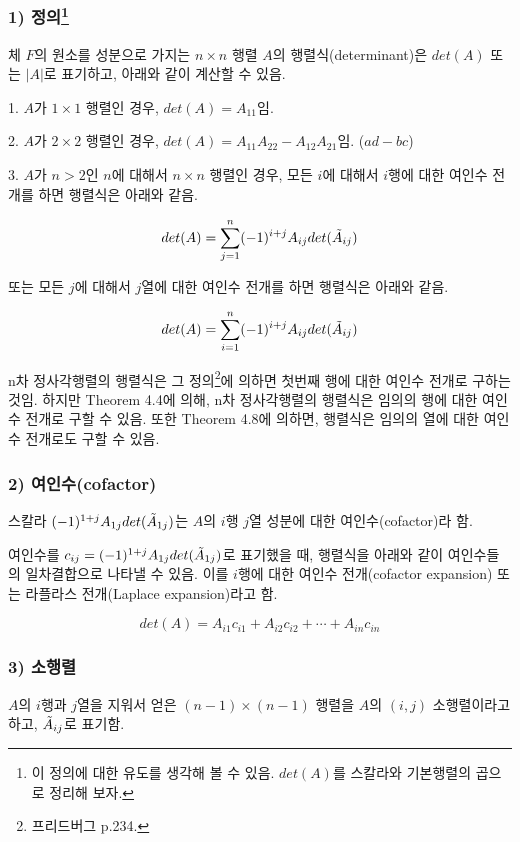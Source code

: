 \subsubsection*{1) 정의\footnote{이 정의에 대한 유도를 생각해 볼 수 있음. $det(A)$를 스칼라와 기본행렬의 곱으로 정리해 보자.}\\}
\begin{DEF}
체 $F$의 원소를 성분으로 가지는 $n \times n$ 행렬 $A$의 행렬식(determinant)은 $det(A)$ 또는 $|A|$로 표기하고, 아래와 같이 계산할 수 있음.

1. $A$가 $1 \times 1$ 행렬인 경우, $det(A)=A_{11}$임.

2. $A$가 $2 \times 2$ 행렬인 경우, $det(A)=A_{11}A_{22}-A_{12}A_{21}$임. ($ad-bc$)

3. $A$가 $n > 2$인 $n$에 대해서 $n \times n$ 행렬인 경우, 모든 $i$에 대해서 $i$행에 대한 여인수 전개를 하면 행렬식은 아래와 같음.

\[
det(A)=\sum^{n}_{j=1}(-1)^{i+j}A_{ij}det(\Tilde{A}_{ij})
\]

또는 모든 $j$에 대해서 $j$열에 대한 여인수 전개를 하면 행렬식은 아래와 같음.

\[
det(A)=\sum^{n}_{i=1}(-1)^{i+j}A_{ij}det(\Tilde{A}_{ij})
\]
\end{DEF}

n차 정사각행렬의 행렬식은 그 정의\footnote{프리드버그 p.234.}에 의하면 첫번째 행에 대한 여인수 전개로 구하는 것임. 하지만 Theorem 4.4에 의해, n차 정사각행렬의 행렬식은 임의의 행에 대한 여인수 전개로 구할 수 있음. 또한 Theorem 4.8에 의하면, 행렬식은 임의의 열에 대한 여인수 전개로도 구할 수 있음.

\subsubsection*{2) 여인수(cofactor)\\}
\begin{DEF}
스칼라 $(-1)^{1+j}A_{1j}det(\Tilde{A}_{1j})$는 $A$의 $i$행 $j$열 성분에 대한 여인수(cofactor)라 함.

여인수를 $c_{ij}=(-1)^{1+j}A_{1j}det(\Tilde{A}_{1j})$로 표기했을 때, 행렬식을 아래와 같이 여인수들의 일차결합으로 나타낼 수 있음. 이를 $i$행에 대한 여인수 전개(cofactor expansion) 또는 라플라스 전개(Laplace expansion)라고 함.

\[
det(A)=A_{i1}c_{i1}+A_{i2}c_{i2}+ \cdots +A_{in}c_{in}
\]
\end{DEF}

\subsubsection*{3) 소행렬\\}
\begin{DEF}
$A$의 $i$행과 $j$열을 지워서 얻은 $(n-1) \times (n-1)$ 행렬을 $A$의 $(i,j)$ 소행렬이라고 하고, $\Tilde{A}_{ij}$로 표기함.
\end{DEF}


